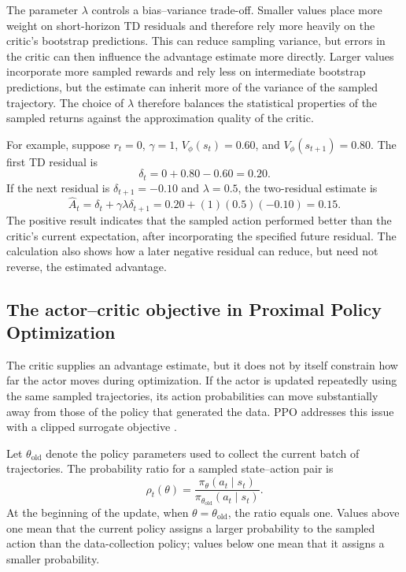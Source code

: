 The parameter \(\lambda\) controls a bias--variance trade-off. Smaller
values place more weight on short-horizon TD residuals and therefore rely
more heavily on the critic's bootstrap predictions. This can reduce
sampling variance, but errors in the critic can then influence the
advantage estimate more directly. Larger values incorporate more sampled
rewards and rely less on intermediate bootstrap predictions, but the
estimate can inherit more of the variance of the sampled trajectory. The
choice of \(\lambda\) therefore balances the statistical properties of
the sampled returns against the approximation quality of the critic.

For example, suppose \(r_t=0\), \(\gamma=1\),
\(V_\phi(s_t)=0.60\), and \(V_\phi(s_{t+1})=0.80\). The first TD residual
is
\begin{equation}
    \delta_t
    =
    0+0.80-0.60
    =
    0.20.
    \label{eq:ac-gae-example-delta}
\end{equation}
If the next residual is \(\delta_{t+1}=-0.10\) and
\(\lambda=0.5\), the two-residual estimate is
\begin{equation}
    \widehat{A}_t
    =
    \delta_t+\gamma\lambda\delta_{t+1}
    =
    0.20+(1)(0.5)(-0.10)
    =
    0.15.
    \label{eq:ac-gae-example-result}
\end{equation}
The positive result indicates that the sampled action performed better
than the critic's current expectation, after incorporating the specified
future residual. The calculation also shows how a later negative residual
can reduce, but need not reverse, the estimated advantage.

\subsection{The actor--critic objective in Proximal Policy Optimization}
\label{subsec:ac-ppo}

The critic supplies an advantage estimate, but it does not by itself
constrain how far the actor moves during optimization. If the actor is
updated repeatedly using the same sampled trajectories, its action
probabilities can move substantially away from those of the policy that
generated the data. PPO addresses this issue with a clipped surrogate
objective \parencite{schulman2017ppo}.

Let \(\theta_{\mathrm{old}}\) denote the policy parameters used to collect
the current batch of trajectories. The probability ratio for a sampled
state--action pair is
\begin{equation}
    \rho_t(\theta)
    =
    \frac{\pi_\theta(a_t\mid s_t)}
    {\pi_{\theta_{\mathrm{old}}}(a_t\mid s_t)}.
    \label{eq:ac-importance-ratio}
\end{equation}
At the beginning of the update, when
\(\theta=\theta_{\mathrm{old}}\), the ratio equals one. Values above one
mean that the current policy assigns a larger probability to the sampled
action than the data-collection policy; values below one mean that it
assigns a smaller probability.

